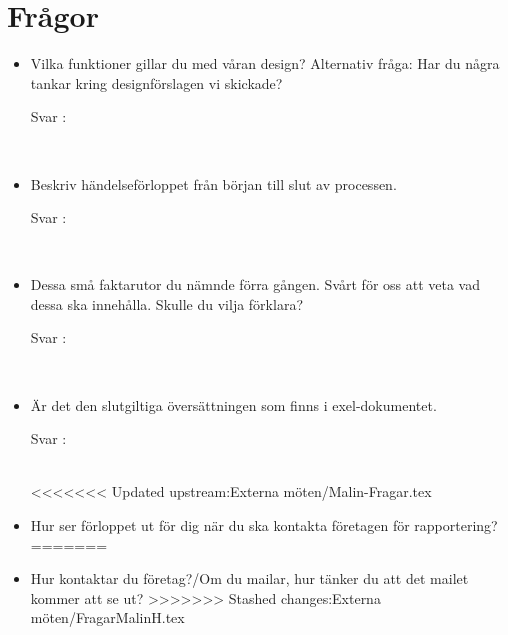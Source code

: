 \documentclass{article}
\date {#1}
\title {
    \documentTitle {Helsingborg Event and Convention Bureau}
    
    \documentDate {}
}
\begin{document}
\maketitle
\thispagestyle{empty}

\newpage




\newpage

\section{Frågor}

 
\begin{itemize}
 \item Vilka funktioner gillar du med våran design? Alternativ fråga: Har du några tankar kring designförslagen vi skickade?
        \begin{description}
            \item[Svar :]
        \end{description}
    \\
    \item Beskriv händelseförloppet från början till slut av processen.
        \begin{description}
            \item[Svar :]
        \end{description}
    \\
    \item Dessa små faktarutor du nämnde förra gången. Svårt för oss att veta vad dessa ska innehålla. Skulle du vilja förklara?
        \begin{description}
            \item[Svar :]
        \end{description}  
    \\
     \item Är det den slutgiltiga översättningen som finns i exel-dokumentet.
        \begin{description}
            \item[Svar :]
        \end{description}
    \\
<<<<<<< Updated upstream:Externa möten/Malin-Fragar.tex
    \item Hur ser förloppet ut för dig när du ska kontakta företagen för rapportering? 
=======
    \item Hur kontaktar du företag?/Om du mailar, hur tänker du att det mailet kommer att se ut?
>>>>>>> Stashed changes:Externa möten/FragarMalinH.tex
    

\end{itemize}
\end{document}
